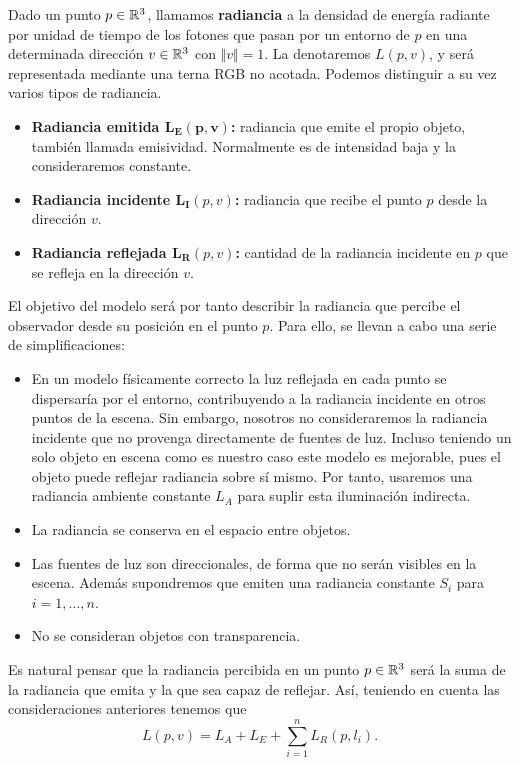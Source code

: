 \begin{definicion}[Radiancia]
    Dado un punto $p\in\mathbb{R}^3$, llamamos \textbf{radiancia} a la densidad de energía radiante por unidad de tiempo de los fotones que pasan por un entorno de $p$ en una determinada dirección $v\in\mathbb{R}^3$ con $\Vert v\Vert = 1$. La denotaremos $L(p,v)$, y será representada mediante una terna RGB no acotada. Podemos distinguir a su vez varios tipos de radiancia.
    \begin{itemize}
        \item \textbf{Radiancia emitida $\boldsymbol{L_E(p,v)}$:} radiancia que emite el propio objeto, también llamada emisividad. Normalmente es de intensidad baja y la consideraremos constante.
        \item \textbf{Radiancia incidente $\boldsymbol{L_{I}}(p,v)$:} radiancia que recibe el punto $p$ desde la dirección $v$. 
        \item \textbf{Radiancia reflejada $\boldsymbol{L_{R}}(p,v)$:} cantidad de la radiancia incidente en $p$ que se refleja en la dirección $v$. 
\end{itemize}
\end{definicion}

El objetivo del modelo será por tanto describir la radiancia que percibe el observador desde su posición en el punto $p$. Para ello, se llevan a cabo una serie de simplificaciones:
\begin{itemize}
    \item En un modelo físicamente correcto la luz reflejada en cada punto se dispersaría por el entorno, contribuyendo a la radiancia incidente en otros puntos de la escena. Sin embargo, nosotros no consideraremos la radiancia incidente que no provenga directamente de fuentes de luz. Incluso teniendo un solo objeto en escena como es nuestro caso este modelo es mejorable, pues el objeto puede reflejar radiancia sobre sí mismo. Por tanto, usaremos una radiancia ambiente constante $L_A$ para suplir esta iluminación indirecta.
    \item La radiancia se conserva en el espacio entre objetos.
    \item Las fuentes de luz son direccionales, de forma que no serán visibles en la escena. Además supondremos que emiten una radiancia constante $S_i$ para $i=1,\dots, n$.
    \item No se consideran objetos con transparencia.
\end{itemize}
Es natural pensar que la radiancia percibida en un punto $p\in \mathbb{R}^3$ será la suma de la radiancia que emita y la que sea capaz de reflejar. Así, teniendo en cuenta las consideraciones anteriores tenemos que
\begin{equation*}
    L(p,v) = L_A + L_E + \sum_{i=1}^n L_R(p,l_i).
\end{equation*}

